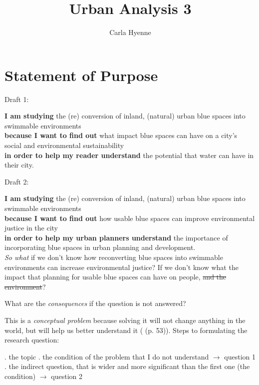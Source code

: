 \documentclass{article}
\title{Urban Analysis 3}
\author{Carla Hyenne}
\begin{document}
\maketitle

\tableofcontents

\pagebreak

\section{Statement of Purpose}

Draft 1:

\textbf{I am studying} the (re) conversion of inland, (natural) urban blue spaces into swimmable environments\\
\textbf{because I want to find out} what impact blue spaces can have on a city's social and environmental sustainability\\
\textbf{in order to help my reader understand} the potential that water can have in their city.

Draft 2:

\textbf{I am studying} the (re) conversion of inland, (natural) urban blue spaces into swimmable environments\\
\textbf{because I want to find out} how usable blue spaces can improve environmental justice in the city \\
\textbf{in order to help my urban planners understand} the importance of incorporating blue spaces in urban planning and development.\\

\textit{So what} if we don't know how reconverting blue spaces into swimmable environments can increase environmental justice? If we don't know what the impact that planning for usable blue spaces can have on people, \sout{and the environment}?

What are the \textit{consequences} if the question is not answered?

This is a \textit{conceptual problem} because solving it will not change anything in the world, but will help us better understand it (\cite{booth2003craft} (p. 53)). Steps to formulating the research question:

\begin{outline}
	. the topic
	. the condition of the problem that I do not understand $\rightarrow$ question 1
	. the indirect question, that is wider and more significant than the first one (the condition) $\rightarrow$ question 2
\end{outline}
	
\end{document}
